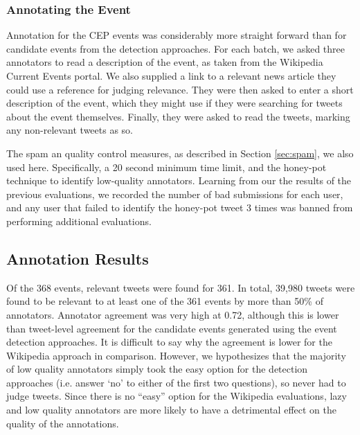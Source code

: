 \subsubsection{Annotating the Event}
Annotation for the CEP events was considerably more straight forward than for candidate events from the detection approaches.
For each batch, we asked three annotators to read a description of the event, as taken from the Wikipedia Current Events portal.
We also supplied a link to a relevant news article they could use a reference for judging relevance.
They were then asked to enter a short description of the event, which they might use if they were searching for tweets about the event themselves.
Finally, they were asked to read the tweets, marking any non-relevant tweets as so.

The spam an quality control measures, as described in Section \ref{sec:spam}, we also used here.
Specifically, a 20 second minimum time limit, and the honey-pot technique to identify low-quality annotators.
Learning from our the results of the previous evaluations, we recorded the number of bad submissions for each user, and any user that failed to identify the honey-pot tweet 3 times was banned from performing additional evaluations.


\subsection{Annotation Results}
Of the 368 events, relevant tweets were found for 361.
In total, 39,980 tweets were found to be relevant to at least one of the 361 events by more than 50\% of annotators.
Annotator agreement was very high at 0.72, although this is lower than tweet-level agreement for the candidate events generated using the event detection approaches.
It is difficult to say why the agreement is lower for the Wikipedia approach in comparison.
However, we hypothesizes that the majority of low quality annotators simply took the easy option for the detection approaches (i.e. answer `no' to either of the first two questions), so never had to judge tweets.
Since there is no ``easy'' option for the Wikipedia evaluations, lazy and low quality annotators are more likely to have a detrimental effect on the quality of the annotations.